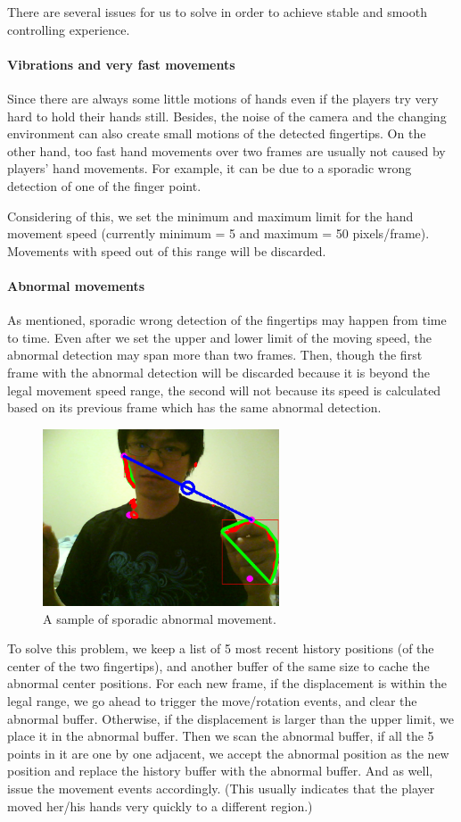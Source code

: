 \documentclass[10pt,twocolumn,letterpaper]{article}
\begin{document}
There are several issues for us to solve in order to achieve stable and smooth controlling experience.

\paragraph{Vibrations and very fast movements} 
Since there are always some little motions of hands even if the players try very hard 
to hold their hands still. Besides, the noise of the camera and the changing environment 
can also create small motions of the detected fingertips. On the other hand, too fast 
hand movements over two frames are usually not caused by players' hand movements. 
For example, it can be due to a sporadic wrong detection of one of the finger point. 

Considering of this, we set the minimum and maximum limit for the hand movement 
speed (currently minimum = 5 and maximum = 50 pixels/frame). Movements with speed 
out of this range will be discarded.

\paragraph{Abnormal movements}
As mentioned, sporadic wrong detection of the fingertips may happen from time 
to time. Even after we set the upper and lower limit of the moving speed, the 
abnormal detection may span more than two frames. Then, though the first frame with 
the abnormal detection will be discarded because it is beyond the legal movement 
speed range, the second will not because its speed is calculated based on its 
previous frame which has the same abnormal detection.

\begin{figure}[h]
\centering
\includegraphics[width=7cm]{abnormal.png}
\caption{A sample of sporadic abnormal movement.}
\label{fig:abnormal}
\end{figure}

To solve this problem, we keep a list of 5 most recent history positions 
(of the center of the two fingertips), and another buffer of the same size 
to cache the abnormal center positions.  For each new frame, if the displacement 
is within the legal range, we go ahead to trigger the move/rotation events, 
and clear the abnormal buffer. Otherwise, if the displacement is larger than 
the upper limit, we place it in the abnormal buffer. Then we scan the abnormal 
buffer, if all the 5 points in it are one by one adjacent, we accept the abnormal 
position as the new position and replace the history buffer with the abnormal 
buffer. And as well, issue the movement events accordingly. (This usually 
indicates that the player moved her/his hands very quickly to a different region.)
\end{document}
